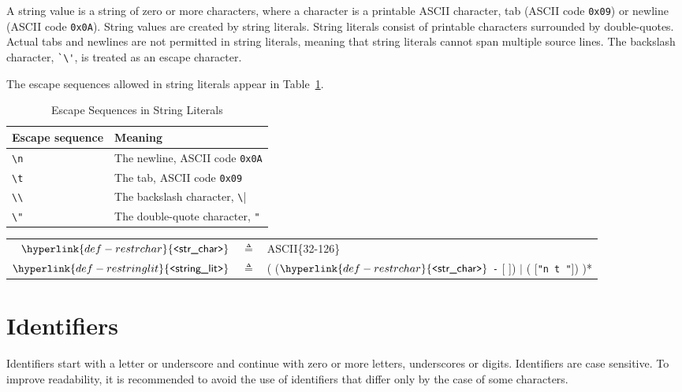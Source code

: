 \documentclass{book}
\newcommand\Char[1]{\fbox{#1}}
\newcommand\REstrchar[0]{\hyperlink{def-restrchar}{\texttt{<}\textsf{str\_char}\texttt{>}}}
\newcommand\REstringlit[0]{\hyperlink{def-restringlit}{\texttt{<}\textsf{string\_lit}\texttt{>}}}
\begin{document}
A string value is a string of zero or more characters, where a character is a printable ASCII character, tab (ASCII
code \texttt{0x09}) or newline (ASCII code \texttt{0x0A}). String values are created by string literals.
String literals consist of printable characters surrounded by double-quotes. Actual tabs and newlines are not
permitted in string literals, meaning that string literals cannot span multiple source lines. The backslash character,
\verb|`\'|, is treated as an escape character.

The escape sequences allowed in string literals appear in Table~\ref{ta:SscapeSeuqnces}.
\begin{table}
\caption{Escape Sequences in String Literals\label{ta:SscapeSeuqnces}}
\begin{center}
\begin{tabular}{ll}
\hline
\textbf{Escape sequence} & \textbf{Meaning}\\
\hline
\verb|\n| & The newline, ASCII code \texttt{0x0A}\\
\verb|\t| & The tab, ASCII code \texttt{0x09}\\
\verb|\\| & The backslash character, \verb|\|\\
\verb|\"| & The double-quote character, \texttt{"}\\
\hline
\end{tabular}
\end{center}
\end{table}

\hypertarget{def-restringlit}{}
\hypertarget{def-restrchar}{}
\begin{center}
\begin{tabular}{rcl}
$\REstrchar$ &$\triangleq$& ASCII\{32-126\}\\
$\REstringlit$ &$\triangleq$& \Char{\texttt{"}} ( ($\REstrchar$ \texttt{-} [ \Char{\texttt{"}} \Char{$\backslash$}]) $|$ (\Char{\textbackslash} [\texttt{"n t \Char{\texttt{"}} \Char{\textbackslash}"}])  )* \Char{\texttt{"}}
\end{tabular}
\end{center}

\section{Identifiers}
Identifiers start with a letter or underscore and continue with zero or more letters, underscores or digits.
Identifiers are case sensitive. To improve readability, it is recommended to avoid the use of identifiers that differ
only by the case of some characters.
\end{document}
